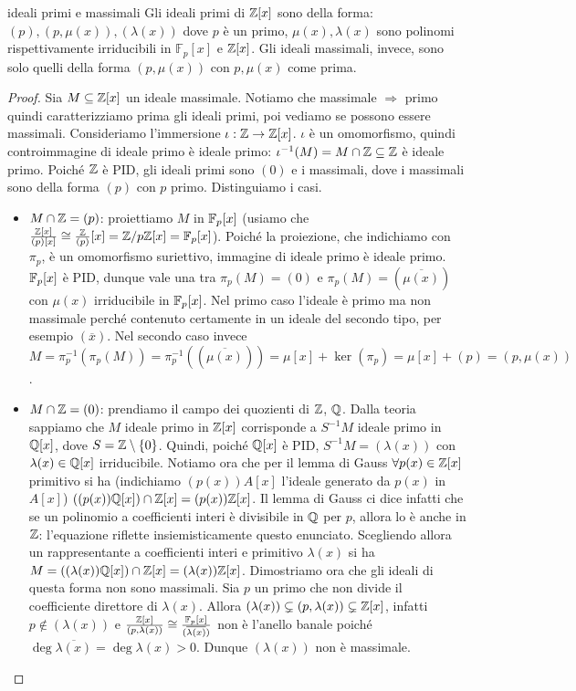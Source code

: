 \begin{proposition}{ideali primi e massimali}
    Gli ideali primi di $\mathbb{Z}[x]$ sono della forma: $(p), (p, \mu(x)), (\lambda(x))$ dove $p$ è un primo, $\mu(x), \lambda(x)$ sono polinomi rispettivamente irriducibili in $\mathbb{F}_p[x]$ e $\mathbb{Z}[x]$. Gli ideali massimali, invece, sono solo quelli della forma $(p,\mu(x))$ con $p, \mu(x)$ come prima. 
\end{proposition}
\begin{proof}
    Sia $M \subseteq \mathbb{Z}[x]$ un ideale massimale. Notiamo che massimale $\Rightarrow$ primo quindi caratterizziamo prima gli ideali primi, poi vediamo se possono essere massimali. Consideriamo l'immersione $\iota: \mathbb{Z} \rightarrow \mathbb{Z}[x]$. $\iota$ è un omomorfismo, quindi controimmagine di ideale primo è ideale primo: $\iota^{-1}(M) = M \cap \mathbb{Z} \subseteq \mathbb{Z}$ è ideale primo. Poiché $\mathbb{Z}$ è PID, gli ideali primi sono $(0)$ e i massimali, dove i massimali sono della forma $(p)$ con $p$ primo. Distinguiamo i casi.
    \begin{itemize}
        \item $M\cap \mathbb{Z} = (p)$: proiettiamo $M$ in $ \mathbb{F}_p [x]$ (usiamo che $\frac{\mathbb{Z}[x]}{(p)[x]} \cong \frac{\mathbb{Z}}{(p)}[x] = \mathbb{Z}/p\mathbb{Z}[x] = \mathbb{F}_p[x]$). Poiché la proiezione, che indichiamo con $\pi_p$, è un omomorfismo suriettivo, immagine di ideale primo è ideale primo. $\mathbb{F}_p [x]$ è PID, dunque vale una tra $\pi_p(M) = (0)$ e $\pi_p(M) = (\overline{\mu(x)}) $ con $\mu(x)$ irriducibile in $\mathbb{F}_p[x]$. Nel primo caso l'ideale è primo ma non massimale perché contenuto certamente in un ideale del secondo tipo, per esempio $(\overline{x})$. Nel secondo caso invece $M = \pi_p^{-1}(\pi_p(M)) = \pi_p^{-1}((\overline{\mu(x)})) = \mu[x] + \ker(\pi_p) = \mu[x]+(p) = (p,\mu(x))$. 
        \item $M\cap \mathbb{Z} = (0)$: prendiamo il campo dei quozienti di $\mathbb{Z}$, $\mathbb{Q}$. Dalla teoria sappiamo che $M$ ideale primo in $\mathbb{Z}[x]$ corrisponde a $S^{-1}M$ ideale primo in $\mathbb{Q}[x]$, dove $S=\mathbb{Z}\setminus \{0\}$. Quindi, poiché $\mathbb{Q}[x]$ è PID, $S^{-1}M = (\lambda(x))$ con $\lambda(x) \in \mathbb{Q}[x]$ irriducibile. Notiamo ora che per il lemma di Gauss $\forall p(x) \in \mathbb{Z}[x]$ primitivo si ha (indichiamo $(p(x))A[x]$ l'ideale generato da $p(x)$ in $A[x]$) $((p(x))\mathbb{Q}[x]) \cap \mathbb{Z}[x] = (p(x))\mathbb{Z}[x]$. Il lemma di Gauss ci dice infatti che se un polinomio a coefficienti interi è divisibile in $\mathbb{Q}$ per $p$, allora lo è anche in $\mathbb{Z}$: l'equazione riflette insiemisticamente questo enunciato.
        Scegliendo allora un rappresentante a coefficienti interi e primitivo $\lambda(x)$ si ha $M = ((\lambda(x))\mathbb{Q}[x]) \cap \mathbb{Z}[x] = (\lambda(x))\mathbb{Z}[x]$. Dimostriamo ora che gli ideali di questa forma non sono massimali. Sia $p$ un primo che non divide il coefficiente direttore di $\lambda(x)$. Allora $(\lambda(x)) \subsetneq (p, \lambda(x)) \subsetneq \mathbb{Z}[x]$, infatti $p \notin (\lambda(x))$ e $\frac{\mathbb{Z}[x]}{(p, \lambda(x))} \cong \frac{\mathbb{F}_p[x]}{(\overline{\lambda(x)})}$ non è l'anello banale poiché $\deg \overline{\lambda(x)} = \deg \lambda(x) > 0$. Dunque $(\lambda(x))$ non è massimale.

\end{itemize}
\end{proof}
